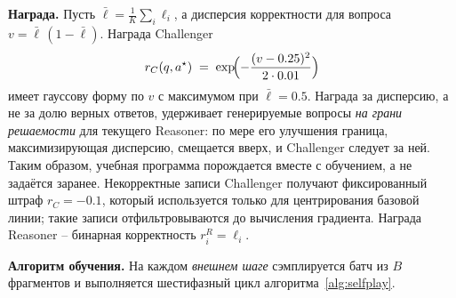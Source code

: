 \documentclass{article}
\begin{document}
\textbf{Награда.} Пусть $\bar\ell = \tfrac{1}{K}\!\sum_i \ell_i$, а дисперсия корректности для вопроса $v = \bar\ell\,(1-\bar\ell)$. Награда Challenger
\begin{equation}
  r_C(q, a^\star) \;=\; \exp\!\Bigl(-\frac{(v - 0.25)^2}{2 \cdot 0.01}\Bigr)
  \label{eq:variance-reward}
\end{equation}
имеет гауссову форму по $v$ с максимумом при $\bar\ell = 0.5$. Награда за дисперсию, а не за долю верных ответов, удерживает генерируемые вопросы \emph{на грани решаемости} для текущего Reasoner: по мере его улучшения граница, максимизирующая дисперсию, смещается вверх, и Challenger следует за ней. Таким образом, учебная программа порождается вместе с обучением, а не задаётся заранее. Некорректные записи Challenger получают фиксированный штраф $r_C = -0.1$, который используется только для центрирования базовой линии; такие записи отфильтровываются до вычисления градиента. Награда Reasoner -- бинарная корректность $r^R_i = \ell_i$.

\textbf{Алгоритм обучения.} На каждом \emph{внешнем шаге} сэмплируется батч из $B$ фрагментов и выполняется шестифазный цикл алгоритма~\ref{alg:selfplay}.
\end{document}
